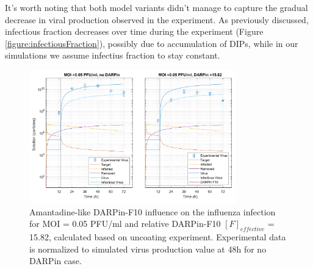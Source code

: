 It's worth noting that both model variants didn't manage to capture the gradual decrease in viral production observed in the experiment. As previously discussed, infectious fraction decreases over time during the experiment (Figure \ref{figure:infectiousFraction}), possibly due to accumulation of DIPs, while in our simulations we assume infectius fraction to stay constant.

\begin{figure}
\begin{center}
\includegraphics[width=0.8\textwidth, trim={0cm 0cm 0cm 0cm}, clip]{D_chapters/3_DARPinModels/2_DARPinInfection/comparisonModelTHillIRVViDelayMOI0.072135DARPin15.816AsymmetricDarpinMyosinInhibitor.pdf}
\caption[Amantadine-like DARPin-F10 for MOI = 0.05 PFU/ml and $F_{effective}$ = 15.82]{Amantadine-like DARPin-F10 influence on the influenza infection for MOI = 0.05 PFU/ml and relative DARPin-F10 $[F]_{effective}$ = 15.82, calculated based on uncoating experiment. Experimental data is normalized to simulated virus production value at 48h for no DARPin case.}
\label{figure:amantadineLikeF15}
\end{center}
\end{figure}

